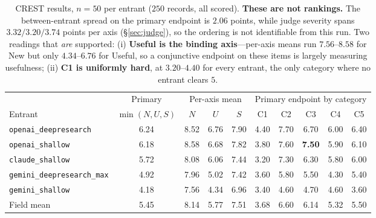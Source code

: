 \begin{table}[t]
\centering
\small
\begin{tabular}{lccccccccc}
\toprule
 & \multicolumn{1}{c}{Primary} & \multicolumn{3}{c}{Per-axis mean} & \multicolumn{5}{c}{Primary endpoint by category} \\
\cmidrule(lr){2-2}\cmidrule(lr){3-5}\cmidrule(lr){6-10}
Entrant & $\min(N,U,S)$ & $N$ & $U$ & $S$ & C1 & C2 & C3 & C4 & C5 \\
\midrule
\texttt{openai\_deepresearch}     & 6.24 & 8.52 & 6.76 & 7.90 & 4.40 & 7.70 & 6.70 & 6.00 & 6.40 \\
\texttt{openai\_shallow}          & 6.18 & 8.58 & 6.68 & 7.82 & 3.80 & 7.60 & \textbf{7.50} & 5.90 & 6.10 \\
\texttt{claude\_shallow}          & 5.72 & 8.08 & 6.06 & 7.44 & 3.20 & 7.30 & 6.30 & 5.80 & 6.00 \\
\texttt{gemini\_deepresearch\_max}& 4.92 & 7.96 & 5.02 & 7.42 & 3.60 & 5.80 & 5.50 & 4.30 & 5.40 \\
\texttt{gemini\_shallow}          & 4.18 & 7.56 & 4.34 & 6.96 & 3.40 & 4.60 & 4.70 & 4.60 & 3.60 \\
\midrule
Field mean                        & 5.45 & 8.14 & 5.77 & 7.51 & 3.68 & 6.60 & 6.14 & 5.32 & 5.50 \\
\bottomrule
\end{tabular}
\caption{CREST results, $n=50$ per entrant ($250$ records, all scored). \textbf{These are not
rankings.} The between-entrant spread on the primary endpoint is $2.06$ points, while judge severity
spans $3.32/3.20/3.74$ points per axis (\S\ref{sec:judge}), so the ordering is not identifiable from
this run. Two readings that \emph{are} supported: (i) \textbf{Useful is the binding axis}---per-axis
means run $7.56$--$8.58$ for New but only $4.34$--$6.76$ for Useful, so a conjunctive endpoint on
these items is largely measuring usefulness; (ii) \textbf{C1 is uniformly hard}, at $3.20$--$4.40$
for every entrant, the only category where no entrant clears $5$.}
\label{tab:results}
\end{table}


